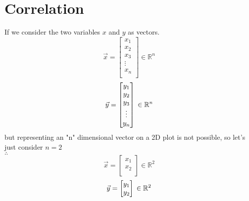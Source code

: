 \documentclass{article}
\begin{document}
\section{Correlation}
If we consider the two variables $x$ and $y$ as vectors.\\
$$
  \vec{x}=\begin{bmatrix}
    x_1    \\
    x_2    \\
    x_3    \\
    \vdots \\
    x_n    \\
  \end{bmatrix} \in \mathbb{R}^n
$$
$$
  \vec{y}=\begin{bmatrix}
    y_1    \\
    y_2    \\
    y_3    \\
    \vdots \\
    y_n    \\
  \end{bmatrix}\\ \in \mathbb{R}^n
$$
but representing an "n" dimensional vector on a 2D plot is not possible, so let's just consider $n=2$\\
$
  \therefore
$
$$
  \vec{x}=\begin{bmatrix}
    x_1 \\
    x_2 \\
  \end{bmatrix} \in \mathbb{R}^2
$$
$$
  \vec{y}=\begin{bmatrix}
    y_1 \\
    y_2 \\
  \end{bmatrix}\\ \in \mathbb{R}^2
$$
\pagebreak
\\
\end{document}
